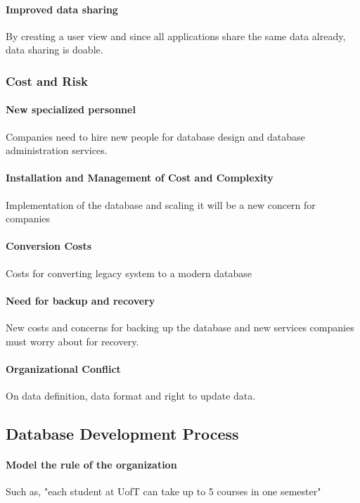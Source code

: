 \documentclass[12pt]{article}
\begin{document}
\paragraph{Improved data sharing} By creating a user view and since all applications share the same data already, data sharing is doable.

\subsubsection{Cost and Risk}

\paragraph{New specialized personnel} Companies need to hire new people for database design and database administration services.

\paragraph{Installation and Management of Cost and Complexity} Implementation of the database and scaling it will be a new concern for companies

\paragraph{Conversion Costs} Costs for converting legacy system to a modern database

\paragraph{Need for backup and recovery} New costs and concerns for backing up the database and new services companies must worry about for recovery.

\paragraph{Organizational Conflict} On data definition, data format and right to update data.

\subsection{Database Development Process}

\paragraph{Model the rule of the organization} Such as, "each student at UofT can take up to 5 courses in one semester"
\end{document}
